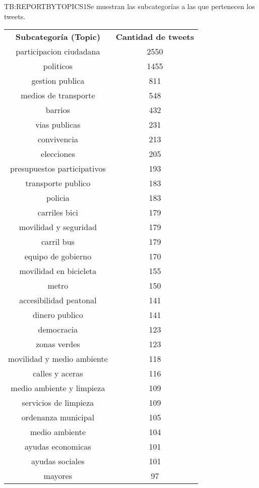 \begin{table}[Resultados de la clasificación de los tweets semánticamente por subcategorías (I).]{TB:REPORTBYTOPICS1}{Se muestran las subcategorías a las que pertenecen los tweets.}
\begin{tabular}{|c|c|}
	\hline
	\textbf{Subcategoría (Topic)} & \textbf{Cantidad de tweets} \\
	participacion ciudadana & 2550 \\
	politicos & 1455 \\
	gestion publica & 811 \\
	medios de transporte & 548 \\
	barrios & 432 \\
	vias publicas & 231 \\
	convivencia & 213 \\
	elecciones & 205 \\
	presupuestos participativos & 193 \\
	transporte publico & 183 \\
	policia & 183 \\
	carriles bici & 179 \\
	movilidad y seguridad & 179 \\
	carril bus & 179 \\
	equipo de gobierno & 170 \\
	movilidad en bicicleta & 155 \\
	metro & 150 \\
	accesibilidad peatonal & 141 \\
	dinero publico & 141 \\
	democracia & 123 \\
	zonas verdes & 123 \\
	movilidad y medio ambiente & 118 \\
	calles y aceras & 116 \\
	medio ambiente y limpieza & 109 \\
	servicios de limpieza & 109 \\
	ordenanza municipal & 105 \\
	medio ambiente & 104 \\
	ayudas economicas & 101 \\
	ayudas sociales & 101 \\
	mayores & 97 \\
	\hline \hline
	\hline
\end{tabular}
\end{table}

